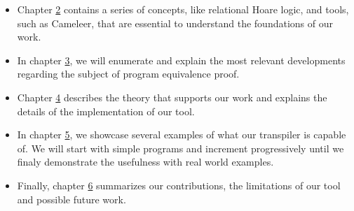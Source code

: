 \begin{itemize}
    \setlength\itemsep{0.1em}
    \item Chapter \hyperref[cha:background]{2} contains a series of concepts, like relational Hoare logic, and tools, such as Cameleer, that are essential to understand the foundations of our work.

    \item In chapter \hyperref[cha:state_of_the_art]{3}, we will enumerate and explain the most relevant developments regarding the subject of program equivalence proof.

    \item Chapter \hyperref[cha:methodology]{4} describes the theory that supports our work and explains the details of the implementation of our tool.

    \item In chapter \hyperref[cha:case_studies]{5}, we showcase several examples of what our transpiler is capable of. 
    We will start with simple programs and increment progressively until we finaly demonstrate the usefulness with real world examples.
    
    \item Finally, chapter \hyperref[cha:conclusion]{6} summarizes our contributions, the limitations of our tool and possible future work.

\end{itemize}
